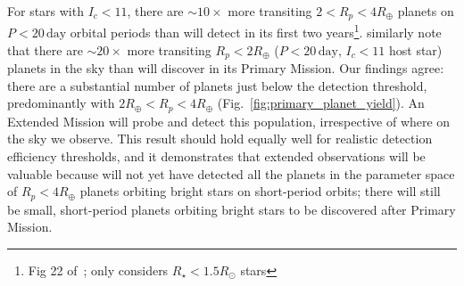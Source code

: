 \begin{enumerate}
        For stars with $I_c<11$, there are $\sim\! 10\times$ more transiting 
        $2<R_p<4R_\oplus$ planets on $P<20\,\mathrm{day}$ orbital periods than 
        \tess will detect in its first two years\footnote{Fig 22
        of~; only considers $R_\star<1.5R_\odot$ 
        stars}.
         similarly note that there are $\sim\! 
        20\times$ more transiting $R_p<2R_\oplus$ ($P<20\,\mathrm{day}$, 
        $I_c<11$ host star) planets in the sky than \tess will discover in 
        its Primary Mission.
	Our findings agree: there are a substantial number of planets just below the detection threshold, predominantly with $2R_\oplus < R_p <4R_\oplus$ (Fig.~\ref{fig:primary_planet_yield}).
	An Extended Mission will probe and detect this population, irrespective of where on the sky we observe.
	This result should hold equally well for realistic detection efficiency 
	thresholds, and it demonstrates that extended observations will be valuable 
	because \tess will not yet have detected all the planets in the parameter 
	space of $R_p<4R_\oplus$ planets orbiting bright stars on short-period 
	orbits;
	there will still be small, short-period planets orbiting bright stars to 
	be discovered after \tesss Primary Mission.



\end{enumerate}
